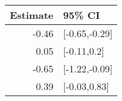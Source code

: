 \begin{tabular}{rl}
  \hline
Estimate & 95\% CI \\ 
  \hline
-0.46 & [-0.65,-0.29] \\ 
  0.05 & [-0.11,0.2] \\ 
  -0.65 & [-1.22,-0.09] \\ 
  0.39 & [-0.03,0.83] \\ 
   \hline
\end{tabular}

